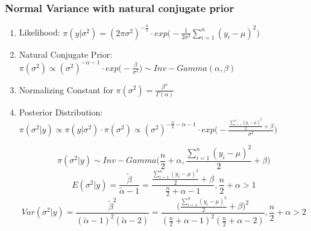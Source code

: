 \documentclass{beamer}
\begin{document}
\begin{frame}
\frametitle{Normal Variance with natural conjugate prior}

\begin{enumerate}
\item Likelihood: $\pi(y|\sigma^2) = (2\pi \sigma^2)^{-\frac{n}{2}} \cdot exp\Big(-\frac{1}{2\sigma^2}\sum_{i=1}^n(y_i-\mu)^2\Big)$

\item Natural Conjugate Prior: $\pi(\sigma^2) \propto (\sigma^2)^{-\alpha -1} \cdot exp\Big(-\frac{\beta}{\sigma^2}\Big) \sim Inv-Gamma(\alpha, \beta)$

\item Normalizing Constant for $\pi(\sigma^2) = \frac{\beta^\alpha}{\Gamma(\alpha)}$

\item Posterior Distribution: $\pi(\sigma^2|y) \propto \pi(y|\sigma^2) \cdot \pi(\sigma^2) \propto (\sigma^2)^{-\frac{n}{2} - \alpha -1} \cdot exp\Big(-\frac{\frac{\sum_{i=1}^n (y_i - \mu)^2}{2}+ \beta}{\sigma^2}\Big)$

$$\pi(\sigma^2|y) \sim Inv-Gamma\Big(\frac{n}{2} + \alpha, \frac{\sum_{i=1}^n (y_i - \mu)^2}{2} + \beta\Big)$$
$$E(\sigma^2|y) = \frac{\tilde \beta}{\tilde \alpha -1} = \frac{\frac{\sum_{i=1}^n (y_i - \mu)^2}{2}+\beta}{\frac{n}{2}+\alpha - 1}, \frac{n}{2} + \alpha >1$$
$$Var(\sigma^2|y) = \frac{\tilde \beta^2}{(\tilde\alpha -1)^2 (\tilde \alpha -2)} = \frac{\Big(\frac{\sum_{i=1}^n (y_i - \mu)^2}{2}+\beta\Big)^2}{(\frac{n}{2}+\alpha - 1)^2 (\frac{n}{2}+\alpha - 2)}, \frac{n}{2}+\alpha>2$$


\end{enumerate}

\end{frame}

\end{document}
